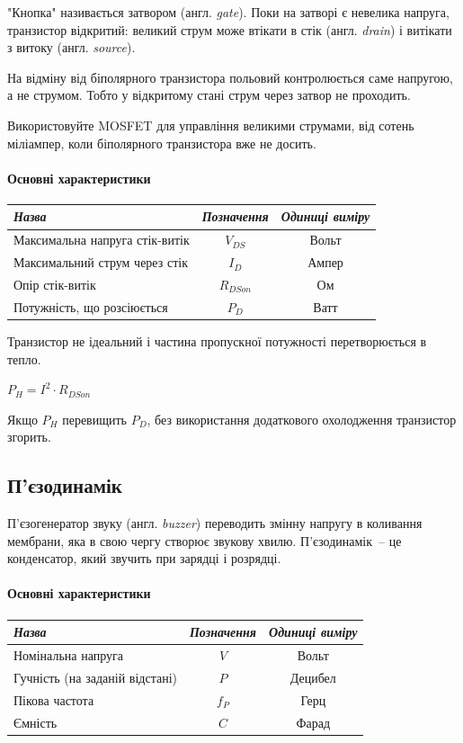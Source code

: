 \documentclass[12pt,a4paper]{book}  %
\begin{document}
"Кнопка" називається затвором (англ. \textit{gate}). Поки на затворі є невелика напруга, транзистор відкритий: великий струм може втікати в стік (англ. \textit{drain}) і витікати з витоку (англ. \textit{source}).

На відміну від біполярного транзистора польовий контролюється саме напругою, а не струмом. Тобто у відкритому стані струм через затвор не проходить.

Використовуйте MOSFET для управління великими струмами, від сотень міліампер, коли біполярного транзистора вже не досить.

\paragraph{Основні характеристики}
\begin{center}
\begin{tabular}{|l|c|c|}
\hline
\textit{Назва} & \textit{Позначення} & \textit{Одиниці виміру} \\
\hline
Максимальна напруга стік-витік & $V_{DS}$ & Вольт \\
\hline		
Максимальний струм через стік & $I_D$ & Ампер \\
\hline
Опір стік-витік & $R_{DSon}$ & Ом \\
\hline
Потужність, що розсіюється & $P_D$ & Ватт \\
\hline
\end{tabular}
\end{center}

Транзистор не ідеальний і частина пропускної потужності перетворюється в тепло.

$ P_H = I^2 \cdot R_{DSon} $

Якщо $P_H$ перевищить $P_D$, без використання додаткового охолодження транзистор згорить.

\subsection{П'єзодинамік}

П'єзогенератор звуку (англ. \textit{buzzer}) переводить змінну напругу в коливання мембрани, яка в свою чергу створює звукову хвилю. П'єзодинамік~-- це конденсатор, який звучить при зарядці і розрядці.

\paragraph{Основні характеристики}
\begin{center}
\begin{tabular}{|l|c|c|}
\hline
\textit{Назва} & \textit{Позначення} & \textit{Одиниці виміру} \\
\hline
Номінальна напруга & $V$ & Вольт \\
\hline		
Гучність (на заданій відстані) & $P$ & Децибел \\
\hline
Пікова частота & $f_P$ & Герц \\
\hline
Ємність & $C$ & Фарад \\
\hline
\end{tabular}
\end{center}
\end{document}
